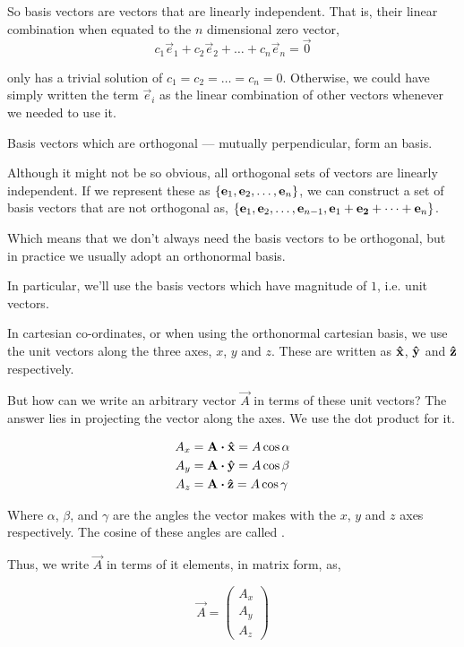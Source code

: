 So basis vectors are vectors that are linearly independent. That is,
their linear combination when equated to the \(n\) dimensional zero vector, 
\[
    c_1\vec{e}_1 + c_2\vec{e}_2 + \dots + c_n\vec{e}_n = \vec{0}\] 

only has a trivial solution of \(c_1 = c_2 = \dots = c_n = 0\). Otherwise, we could have simply written the term \(\vec{e}_i\) as the linear combination of other vectors whenever we needed to use it.

Basis vectors which are orthogonal --- mutually perpendicular, form an  basis.

Although it might not be so obvious, all orthogonal sets of vectors are linearly 
independent. If we represent these as \(\left\{\boldsymbol{\mathbf{e}}_1, \boldsymbol{\mathbf{e}}_2, \dots, \boldsymbol{\mathbf{e}}_n\right\}\), we
can construct a set of basis vectors that are not orthogonal as,
\(\left\{\boldsymbol{\mathbf{e}}_1, \boldsymbol{\mathbf{e}}_2, \dots, \boldsymbol{\mathbf{e}}_{n-1}, \boldsymbol{\mathbf{e}}_1 + \boldsymbol{\mathbf{e_2}} + \dots + \boldsymbol{\mathbf{e}}_n\right\}\).

Which means that we don't always need the basis vectors to be orthogonal, but
in practice we usually adopt an orthonormal basis.

In particular, we'll use the basis vectors which have magnitude of \(1\), i.e. unit vectors.

In cartesian co-ordinates, or when using the orthonormal cartesian basis, we use the unit vectors along the three axes, \(x\), \(y\) and 
\(z\). These are written as \(\boldsymbol{\mathbf{\hat{x}}}\), \(\boldsymbol{\mathbf{\hat{y}}}\) and \(\boldsymbol{\mathbf{\hat{z}}}\) respectively.

But how can we write an arbitrary vector \(\vec{A}\) in terms of these unit vectors?
The answer lies in projecting the vector along the axes. We use the dot product for it.

\begin{align}
    A_x &= \vec{A} \dtp \unitv{x} = A \cos \alpha \\
    A_y &= \vec{A} \dtp \unitv{y} = A \cos \beta \\
    A_z &= \vec{A} \dtp \unitv{z} = A \cos \gamma 
\end{align}

Where \(\alpha\), \(\beta\), and \(\gamma\) are the angles 
the vector makes with the \(x\), \(y\) and \(z\) axes respectively.
The cosine of these angles are called . 

Thus, we write \(\vec{A}\) in terms of it elements, in matrix form, as, 

\begin{equation}
    \vec{A} = 
    \begin{pmatrix}
        A_x \\
        A_y \\
        A_z
    \end{pmatrix}
\end{equation}
    

